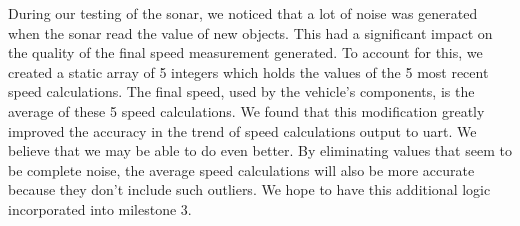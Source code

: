 During our testing of the sonar, we noticed that a lot of noise was generated when the sonar read the value of new objects. This had a significant impact on the quality of the final speed measurement generated. To account for this, we created a static array of 5 integers which holds the values of the 5 most recent speed calculations. The final speed, used by the vehicle's components, is the average of these 5 speed calculations. We found that this modification greatly improved the accuracy in the trend of speed calculations output to uart. We believe that we may be able to do even better. By eliminating values that seem to be complete noise, the average speed calculations will also be more accurate because they don't include such outliers. We hope to have this additional logic incorporated into milestone 3.

\lstset{language=c}
